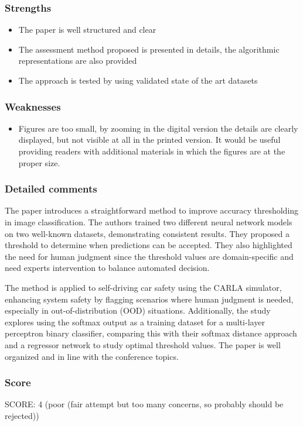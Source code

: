 \subsubsection*{Strengths}
\begin{itemize}
    \item The paper is well structured and clear
    \item The assessment method proposed is presented in details, the algorithmic representations are also provided
    \item The approach is tested by using validated state of the art datasets
\end{itemize}

\subsubsection*{Weaknesses}
\begin{itemize}
    \item Figures are too small, by zooming in the digital version the details are clearly displayed, but not visible at all in the printed version. It would be useful providing readers with additional materials in which the figures are at the proper size.
\end{itemize}

\subsubsection*{Detailed comments}
The paper introduces a straightforward method to improve accuracy thresholding in image classification. The authors trained two different neural network models on two well-known datasets, demonstrating consistent results. They proposed a threshold to determine when predictions can be accepted. They also highlighted the need for human judgment since the threshold values are domain-specific and need experts intervention to balance automated decision.

The method is applied to self-driving car safety using the CARLA simulator, enhancing system safety by flagging scenarios where human judgment is needed, especially in out-of-distribution (OOD) situations. Additionally, the study explores using the softmax output as a training dataset for a multi-layer perceptron binary classifier, comparing this with their softmax distance approach and a regressor network to study optimal threshold values. The paper is well organized and in line with the conference topics.

\subsubsection*{Score}
SCORE: 4 (poor (fair attempt but too many concerns, so probably should be rejected))

